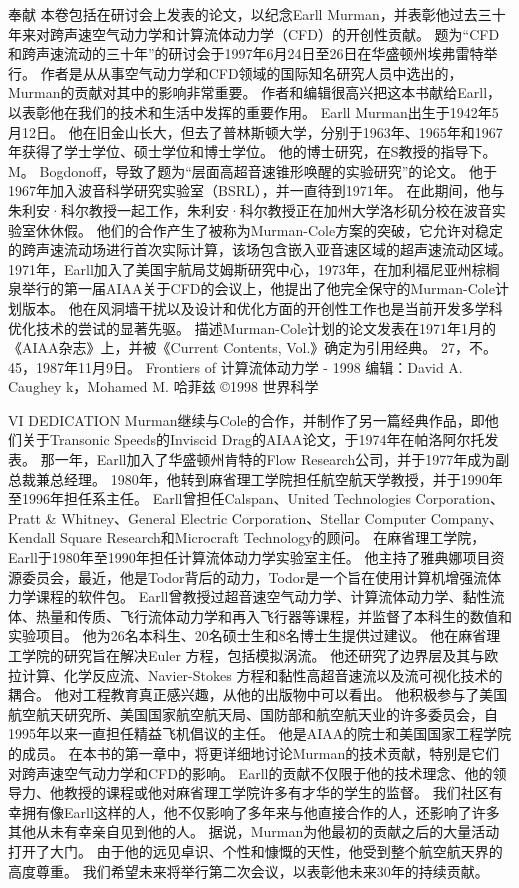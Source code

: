 \documentclass[UTF8,11pt,a4paper,openany,fontset=fandol]{ctexbook}
\begin{document}
奉献 本卷包括在研讨会上发表的论文，以纪念Earll Murman，并表彰他过去三十年来对跨声速空气动力学和计算流体动力学（CFD）的开创性贡献。 题为“CFD和跨声速流动的三十年”的研讨会于1997年6月24日至26日在华盛顿州埃弗雷特举行。 作者是从从事空气动力学和CFD领域的国际知名研究人员中选出的，Murman的贡献对其中的影响非常重要。 作者和编辑很高兴把这本书献给Earll，以表彰他在我们的技术和生活中发挥的重要作用。 Earll Murman出生于1942年5月12日。 他在旧金山长大，但去了普林斯顿大学，分别于1963年、1965年和1967年获得了学士学位、硕士学位和博士学位。 他的博士研究，在S教授的指导下。 M。 Bogdonoff，导致了题为“层面高超音速锥形唤醒的实验研究”的论文。 他于1967年加入波音科学研究实验室（BSRL），并一直待到1971年。 在此期间，他与朱利安·科尔教授一起工作，朱利安·科尔教授正在加州大学洛杉矶分校在波音实验室休休假。 他们的合作产生了被称为Murman-Cole方案的突破，它允许对稳定的跨声速流动场进行首次实际计算，该场包含嵌入亚音速区域的超声速流动区域。 1971年，Earll加入了美国宇航局艾姆斯研究中心，1973年，在加利福尼亚州棕榈泉举行的第一届AIAA关于CFD的会议上，他提出了他完全保守的Murman-Cole计划版本。 他在风洞墙干扰以及设计和优化方面的开创性工作也是当前开发多学科优化技术的尝试的显著先驱。 描述Murman-Cole计划的论文发表在1971年1月的《AIAA杂志》上，并被《Current Contents, Vol.》确定为引用经典。 27，不。 45，1987年11月9日。 Frontiers of 计算流体动力学 - 1998 编辑：David A. Caughey k，Mohamed M. 哈菲兹 ©1998 世界科学

VI DEDICATION Murman继续与Cole的合作，并制作了另一篇经典作品，即他们关于Transonic Speeds的Inviscid Drag的AIAA论文，于1974年在帕洛阿尔托发表。 那一年，Earll加入了华盛顿州肯特的Flow Research公司，并于1977年成为副总裁兼总经理。 1980年，他转到麻省理工学院担任航空航天学教授，并于1990年至1996年担任系主任。 Earll曾担任Calspan、United Technologies Corporation、Pratt \& Whitney、General Electric Corporation、Stellar Computer Company、Kendall Square Research和Microcraft Technology的顾问。 在麻省理工学院，Earll于1980年至1990年担任计算流体动力学实验室主任。 他主持了雅典娜项目资源委员会，最近，他是Todor背后的动力，Todor是一个旨在使用计算机增强流体力学课程的软件包。 Earll曾教授过超音速空气动力学、计算流体动力学、黏性流体、热量和传质、飞行流体动力学和再入飞行器等课程，并监督了本科生的数值和实验项目。 他为26名本科生、20名硕士生和8名博士生提供过建议。 他在麻省理工学院的研究旨在解决Euler 方程，包括模拟涡流。 他还研究了边界层及其与欧拉计算、化学反应流、Navier-Stokes 方程和黏性高超音速流以及流可视化技术的耦合。 他对工程教育真正感兴趣，从他的出版物中可以看出。 他积极参与了美国航空航天研究所、美国国家航空航天局、国防部和航空航天业的许多委员会，自1995年以来一直担任精益飞机倡议的主任。 他是AIAA的院士和美国国家工程学院的成员。 在本书的第一章中，将更详细地讨论Murman的技术贡献，特别是它们对跨声速空气动力学和CFD的影响。 Earll的贡献不仅限于他的技术理念、他的领导力、他教授的课程或他对麻省理工学院许多有才华的学生的监督。 我们社区有幸拥有像Earll这样的人，他不仅影响了多年来与他直接合作的人，还影响了许多其他从未有幸亲自见到他的人。 据说，Murman为他最初的贡献之后的大量活动打开了大门。 由于他的远见卓识、个性和慷慨的天性，他受到整个航空航天界的高度尊重。 我们希望未来将举行第二次会议，以表彰他未来30年的持续贡献。
\end{document}
